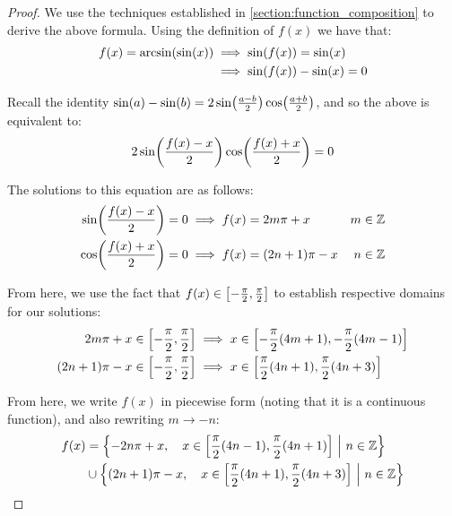 \begin{proof}
    We use the techniques established in \autoref{section:function_composition} to derive the above formula. Using the definition of $f(x)$ we have that:
    \begin{align*}
        f(x)=\arcsin\paren{\sin\paren{x}} &\implies \sin\paren{f(x)}=\sin\paren{x} \\
        &\implies \sin\paren{f(x)}-\sin\paren{x}=0
    \end{align*}

    Recall the identity $\sin\paren{a}-\sin\paren{b}=2\sin\paren*{\frac{a-b}{2}}\cos\paren*{\frac{a+b}{2}}$, and so the above is equivalent to:
    $$
        2\sin\paren*{\frac{f(x)-x}{2}}\cos\paren*{\frac{f(x)+x}{2}}=0
    $$

    The solutions to this equation are as follows\footnotemark:
    \begin{align}
        \sin\paren*{\frac{f(x)-x}{2}}=0 &\implies f(x)=2m\pi+x & m\in\mathbb{Z} \\
        \cos\paren*{\frac{f(x)+x}{2}}=0 &\implies f(x)=(2n+1)\pi-x & n\in\mathbb{Z}
    \end{align}


    From here, we use the fact that $f(x)\in\brak*{-\frac{\pi}{2},\frac{\pi}{2}}$ to establish respective domains for our solutions:
    \begin{align}
        2m\pi+x\in\brak*{-\frac{\pi}{2},\frac{\pi}{2}} &\implies x\in\brak*{-\frac{\pi}{2}(4m+1),-\frac{\pi}{2}(4m-1)} \\
        (2n+1)\pi-x\in\brak*{-\frac{\pi}{2},\frac{\pi}{2}} &\implies x\in\brak*{\frac{\pi}{2}(4n+1),\frac{\pi}{2}(4n+3)}
    \end{align}

    From here, we write $f(x)$ in piecewise form (noting that it is a continuous function), and also rewriting $m\to-n$:
    \begin{align*}
        f(x) &= \pwobj{-2n\pi+x}{x\in\brak*{\frac{\pi}{2}(4n-1),\frac{\pi}{2}(4n+1)}}{n\in\mathbb{Z}} \\
             &\cup \pwobj{(2n+1)\pi-x}{x\in\brak*{\frac{\pi}{2}(4n+1),\frac{\pi}{2}(4n+3)}}{n\in\mathbb{Z}}
    \end{align*}


\end{proof}
